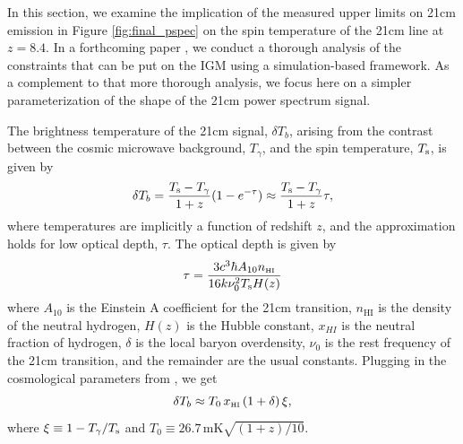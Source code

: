 \documentclass[twocolumn,numberedappendix]{emulateapj} \shorttitle{New Limits on the 21 cm Power Spectrum at $z=8.4$}
\newcommand{\Tspin}{T_{\rm s}}
\newcommand{\Tcmb}{T_\gamma}
\begin{document}
In this section, we examine the implication of the measured upper limits
on 21cm emission in Figure \ref{fig:final_pspec} on the spin temperature
of the 21cm line at $z=8.4$.
In a forthcoming paper \citet{pober_et_al2015}, we conduct a thorough analysis of the
constraints that can be put on the IGM using a simulation-based framework.
As a complement to that more thorough
analysis, we focus here on a simpler parameterization of the shape
of the 21cm power spectrum signal. 

The brightness temperature of the 21cm signal, $\delta{T_{b}}$, arising from the
contrast between the cosmic
microwave background, $\Tcmb$, and the spin temperature, $\Tspin$, is given
by 
\begin{equation}\label{eqn:tb}
    \delta{T_{b}} = \frac{\Tspin - \Tcmb}{1+z}(1-e^{-\tau})
\approx \frac{\Tspin - \Tcmb}{1+z}\tau,
\end{equation}
where temperatures are implicitly a function of redshift $z$, and
the approximation holds for low optical depth, $\tau$. 
The optical depth is given by \citep{zaldarriaga_et_al2004}
\begin{equation}\label{eqn:tau}
    \tau = \frac{3c^3\hbar A_{10} n_{\text{\tiny{HI}}}}{16k\nu_0^2\Tspin H(z)}
\end{equation}
where $A_{10}$ is the Einstein A coefficient for the 21cm transition,
$n_{\text{HI}}$ is the density of the neutral hydrogen, $H(z)$ is the Hubble
constant, $x_{HI}$ is the neutral fraction of hydrogen, $\delta$ is the local
baryon overdensity, $\nu_0$ is the rest frequency of the 21cm transition, and 
the remainder are the usual constants.
Plugging in the cosmological parameters from \citet{planck_et_al2015}, 
we get 
\begin{equation}\label{eqn:final_tb}
    \delta{T_{b}} \approx T_{0}\,x_{\text{\tiny{HI}}}\,(1+\delta)\, \xi ,
\end{equation}
where $\xi\equiv1-\Tcmb/\Tspin$ and $T_0\equiv26.7 \,
\text{mK} \sqrt{(1+z)/10}$.
\end{document}
